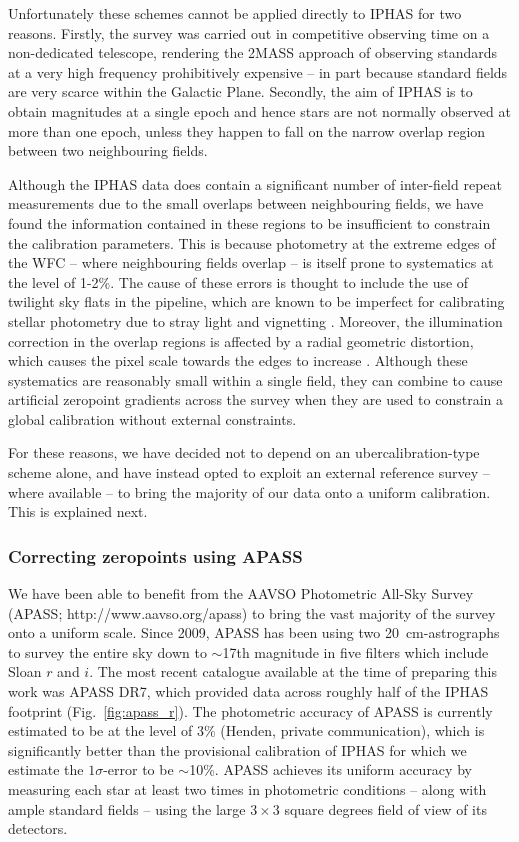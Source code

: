 \documentclass[useAMS,usenatbib]{mn2e}
\begin{document}
Unfortunately these schemes cannot be applied
directly to IPHAS
for two reasons. 
Firstly, the survey was carried out 
in competitive observing time
on a non-dedicated telescope, 
rendering the 2MASS approach 
of observing standards at a very high frequency
prohibitively expensive
-- in part because standard fields 
are very scarce within the Galactic Plane.
Secondly, the aim of IPHAS is to obtain magnitudes at a single epoch
and hence stars are not normally observed at more than one epoch,
unless they happen to fall on the narrow overlap region 
between two neighbouring fields.

Although the IPHAS data does contain a significant number of 
inter-field repeat measurements
due to the small overlaps
between neighbouring fields,
we have found the information contained
in these regions to be insufficient
to constrain the calibration parameters.
This is because photometry at the extreme edges of the WFC
-- where neighbouring fields overlap -- 
is itself prone to systematics at the level of 1-2\%.
The cause of these errors is thought to include 
the use of twilight sky flats in the pipeline,
which are known to be imperfect for calibrating stellar photometry 
due to stray light and vignetting \citep[e.g.][]{Manfroid1995}.
Moreover, the illumination correction in the overlap regions
is affected by a radial geometric distortion,
which causes the pixel scale towards the edges 
to increase \citep{Gonzalez-Solares2011}.
Although these systematics are reasonably small within a single field,
they can combine to cause artificial zeropoint gradients 
across the survey
when they are used to constrain a global calibration
without external constraints.

For these reasons, we have decided not to depend
on an ubercalibration-type scheme alone,
and have instead opted to exploit an external reference survey
-- where available --
to bring the majority of our data onto a uniform calibration.
This is explained next.

\subsubsection{Correcting zeropoints using APASS}

We have been able to benefit from the
AAVSO Photometric All-Sky Survey
(APASS; http://www.aavso.org/apass)
to bring the vast majority of the survey 
onto a uniform scale.
Since 2009,
APASS has been using two 20~cm-astrographs
to survey the entire sky down to $\sim$17th magnitude
in five filters which include Sloan $r$ and $i$.
The most recent catalogue available 
at the time of preparing this work was APASS DR7,
which provided data across roughly half of the IPHAS footprint (Fig.~\ref{fig:apass_r}).
The photometric accuracy of APASS is currently estimated 
to be at the level of 3\% (Henden, private communication),
which is significantly better 
than the provisional calibration of IPHAS
for which we estimate the $1\sigma$-error to be $\sim$10\%.
APASS achieves its uniform accuracy 
by measuring each star at least two times in photometric conditions
-- along with ample standard fields --
using the large $3\times3$ square degrees field of view of its detectors.
\end{document}
